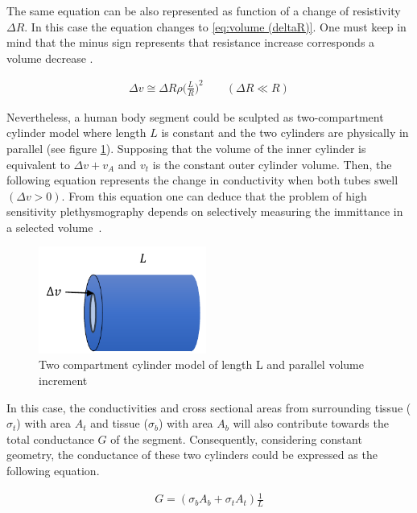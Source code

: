 The same equation can be also represented as function of a change of resistivity $\Delta R$. In this case the equation changes to  \ref{eq:volume (deltaR)}. One must keep in mind that the minus sign represents that resistance increase corresponds a volume decrease \cite{martinsen2011bioimpedance}. 

\begin{align}
	\label{eq:volume (deltaR)}
	\Delta v \cong \Delta R \rho \bigg( \frac{L}{R} \bigg)^2 \qquad (\Delta R \ll R)
\end{align}

Nevertheless, a human body segment could be sculpted as two-compartment cylinder model where length $L$ is constant and the two cylinders are physically in parallel (see figure \ref{fig:two cylinder modell}). Supposing that the volume of the inner cylinder is equivalent to $\Delta v + v_A$ and $v_t$ is the constant outer cylinder volume.  Then, the following equation represents the change in conductivity when both tubes swell $(\Delta v > 0)$. From this equation one can deduce that the problem of high sensitivity plethysmography depends on selectively measuring the immittance in a selected volume~\cite{martinsen2011bioimpedance}.

\begin{figure}[!htpb]
	\centering
	\includegraphics[width=5.5cm,keepaspectratio]{figure5}    
	\caption[Two compartment cylinder model]{Two compartment cylinder model of length L and parallel volume increment}
	\label{fig:two cylinder modell}
\end{figure}

In this case, the conductivities and cross sectional areas from surrounding tissue ($\sigma_t$) with area $A_t$ and tissue ($\sigma_b$) with area $A_b$ will also contribute towards the total conductance $G$ of the segment. Consequently, considering constant geometry, the conductance of these two cylinders could be expressed as the following equation.

\begin{align}
	G = (\sigma_b A_b + \sigma_t A_t) \frac{1}{L}
\end{align}

